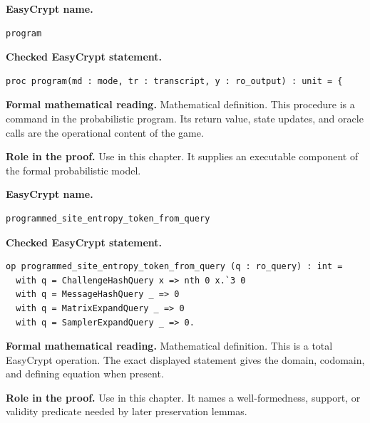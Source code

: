\begin{formaldefinition}
\noindent\textbf{EasyCrypt name.}
\begin{lstlisting}[language=EasyCrypt,basicstyle=\ttfamily\scriptsize]
program
\end{lstlisting}
\noindent\textbf{Checked EasyCrypt statement.}
\begin{lstlisting}[language=EasyCrypt,basicstyle=\ttfamily\scriptsize]
proc program(md : mode, tr : transcript, y : ro_output) : unit = {
\end{lstlisting}
\noindent\textbf{Formal mathematical reading.}
Mathematical definition. This procedure is a command in the probabilistic program.  Its return value, state updates, and oracle calls are the operational content of the game.

\noindent\textbf{Role in the proof.}
Use in this chapter. It supplies an executable component of the formal probabilistic model.

\end{formaldefinition}

\begin{formaldefinition}
\noindent\textbf{EasyCrypt name.}
\begin{lstlisting}[language=EasyCrypt,basicstyle=\ttfamily\scriptsize]
programmed_site_entropy_token_from_query
\end{lstlisting}
\noindent\textbf{Checked EasyCrypt statement.}
\begin{lstlisting}[language=EasyCrypt,basicstyle=\ttfamily\scriptsize]
op programmed_site_entropy_token_from_query (q : ro_query) : int =
  with q = ChallengeHashQuery x => nth 0 x.`3 0
  with q = MessageHashQuery _ => 0
  with q = MatrixExpandQuery _ => 0
  with q = SamplerExpandQuery _ => 0.
\end{lstlisting}
\noindent\textbf{Formal mathematical reading.}
Mathematical definition. This is a total EasyCrypt operation.  The exact displayed statement gives the domain, codomain, and defining equation when present.

\noindent\textbf{Role in the proof.}
Use in this chapter. It names a well-formedness, support, or validity predicate needed by later preservation lemmas.

\end{formaldefinition}

